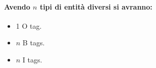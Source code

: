 \paragraph{Avendo $n$ tipi di entità diversi si avranno:}

\begin{itemize}
  \item 1 O tag. 
  \item $n$ B tags. 
  \item $n$ I tags. 
\end{itemize}





